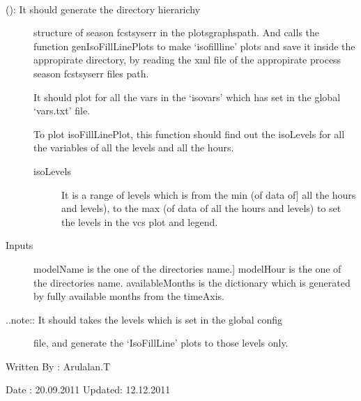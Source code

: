 \documentclass[letterpaper,10pt,english]{sphinxmanual}
\begin{document}

\begin{fulllineitems}
\label{diagnosis:generate_iso_plots.genSeasonFcstSysErrDirs}~\begin{description}
\item[{{\hyperref[diagnosis:generate_iso_plots.genSeasonFcstSysErrDirs]{}} (): It should generate the directory hierarichy}] \leavevmode
structure of season fcstsyserr in the plotsgraphspath. And calls the
function genIsoFillLinePlots to make `isofillline' plots and save it
inside the appropirate directory, by reading the xml file of the
appropirate process season fcstsyserr files path.

It should plot for all the vars in the `isovars' which has set in the
global `vars.txt' file.

To plot isoFillLinePlot, this function should find out the isoLevels
for all the variables of all the levels and all the hours.
\begin{description}
\item[{isoLevels}] \leavevmode{[}It is a range of levels which is from the min (of data of{]}
all the hours and levels), to the max (of data of all the hours and
levels) to set the levels in the vcs plot and legend.

\end{description}

\item[{Inputs}] \leavevmode{[}modelName is the one of the directories name.{]}
modelHour is the one of the directories name.
availableMonths is the dictionary which is generated by fully
available months from the timeAxis.

\item[{..note:: It should takes the levels which is set in the global config}] \leavevmode
file, and generate the `IsoFillLine' plots to those levels only.

\end{description}

Written By : Arulalan.T

Date : 20.09.2011
Updated: 12.12.2011

\end{fulllineitems}
\end{document}
